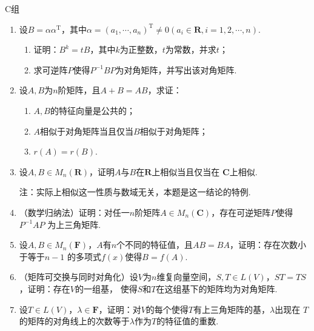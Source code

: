 \centerline{\heiti C组}
\begin{enumerate}
    \item 设$B=\alpha\alpha^\mathrm{T}$，其中$\alpha=(a_1,\cdots,a_n)^\mathrm{T}\neq 0(a_i\in\mathbf{R},i=1,2,\cdots,n)$.
	\begin{enumerate}[label=(\arabic*)]
        \item 证明：$B^k=tB$，其中$k$为正整数，$t$为常数，并求$t$；
        \item 求可逆阵$P$使得$P^{-1}BP$为对角矩阵，并写出该对角矩阵.
    \end{enumerate}
	\item 设$A,B$为$n$阶矩阵，且$A+B=AB$，求证：
	\begin{enumerate}[label=(\arabic*)]
        \item $A,B$的特征向量是公共的；
        \item $A$相似于对角矩阵当且仅当$B$相似于对角矩阵；
        \item $r(A)=r(B)$.
    \end{enumerate}
	\item 设$A,B\in M_n(\mathbf{R})$，证明$A$与$B$在$\mathbf{R}$上相似当且仅当在
	$\mathbf{C}$上相似.

	注：实际上相似这一性质与数域无关，本题是这一结论的特例.
	\item （数学归纳法）证明：对任一$n$阶矩阵$A\in M_n(\mathbf{C})$，存在可逆矩阵$P$使得$P^{-1}AP$
	为上三角矩阵.
	\item 设$A,B\in M_n(\mathbf{F})$，$A$有$n$个不同的特征值，且$AB=BA$，证明：存在次数小于等于$n-1$
	的多项式$f(x)$使得$B=f(A)$.
    \item （矩阵可交换与同时对角化）设$V$为$n$维复向量空间，$S,T\in L(V)$，$ST=TS$，证明：存在$V$的一组基，
	使得$S$和$T$在这组基下的矩阵均为对角矩阵.
	\item 设$T\in L(V)$，$\lambda\in\mathbf{F}$，证明：对$V$的每个使得$T$有上三角矩阵的基，$\lambda$出现在
	$T$的矩阵的对角线上的次数等于$\lambda$作为$T$的特征值的重数.
\end{enumerate}
